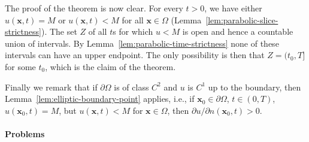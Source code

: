 The proof of the theorem is now clear. For every $t>0$, we have either $u(\bm{x},t)=M$ or $u(\bm{x},t)<M$ for all $\bm{x}\in\Omega$ (Lemma~\ref{lem:parabolic-slice-strictness}). The set $Z$ of all $t$\textquotesingle s for which $u<M$ is open and hence a countable union of intervals. By Lemma~\ref{lem:parabolic-time-strictness} none of these intervals can have an upper endpoint. The only possibility is then that $Z=(t_0,T]$ for some $t_0$, which is the claim of the theorem.

Finally we remark that if $\partial\Omega$ is of class $C^2$ and $u$ is $C^1$ up to the boundary, then Lemma~\ref{lem:elliptic-boundary-point} applies, i.e., if $\bm{x}_0\in\partial\Omega$, $t\in(0,T)$, $u(\bm{x}_0,t)=M$, but $u(\bm{x},t)<M$ for $\bm{x}\in\Omega$, then $\partial u/\partial n(\bm{x}_0,t)>0$.

\paragraph*{Problems}


